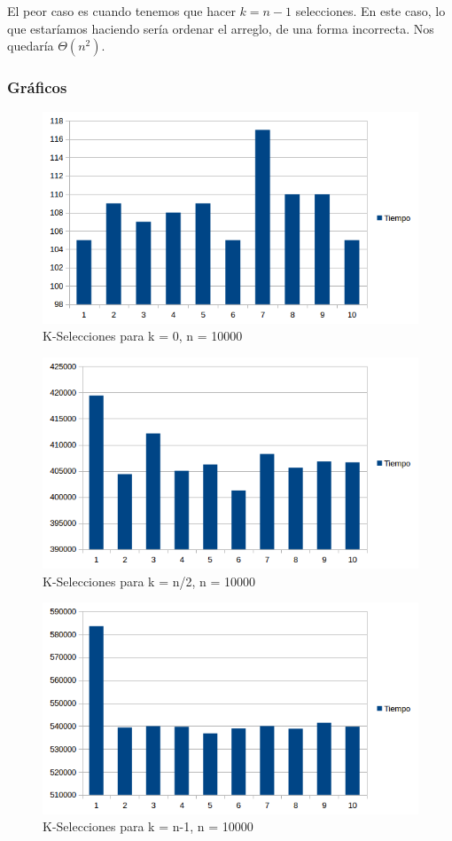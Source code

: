 El peor caso es cuando tenemos que hacer $k = n-1$ selecciones. En este caso, lo que estaríamos haciendo sería ordenar el arreglo, de una forma incorrecta. Nos quedaría $\Theta(n^2)$.
\subsubsection{Gráficos}
\begin{figure}[H]
\centering
\includegraphics[width=\textwidth]{KZero/KSelectK0.png}
\caption{K-Selecciones para k = 0, n = 10000}
\end{figure}

\begin{figure}[H]
\centering
\includegraphics[width=\textwidth]{KN2/KSelectN2.png}
\caption{K-Selecciones para k = n/2, n = 10000}
\end{figure}

\begin{figure}[H]
\centering
\includegraphics[width=\textwidth]{KN/KSelectN.png}
\caption{K-Selecciones para k = n-1, n = 10000}
\end{figure}


